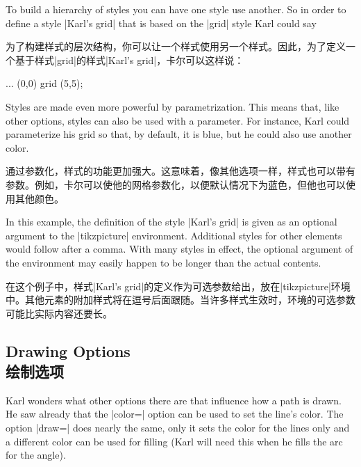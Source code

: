 To build a hierarchy of styles you can have one style use another. So in order
to define a style |Karl's grid| that is based on the |grid| style Karl could
say
%

为了构建样式的层次结构，你可以让一个样式使用另一个样式。因此，为了定义一个基于样式|grid|的样式|Karl's grid|，卡尔可以这样说：

\begin{codeexample}
...
 (0,0) grid (5,5);
\end{codeexample}

Styles are made even more powerful by parametrization. This means that, like
other options, styles can also be used with a parameter. For instance, Karl
could parameterize his grid so that, by default, it is blue, but he could also
use another color.
%

通过参数化，样式的功能更加强大。这意味着，像其他选项一样，样式也可以带有参数。例如，卡尔可以使他的网格参数化，以便默认情况下为蓝色，但他也可以使用其他颜色。

\begin{codeexample}
\end{codeexample}

 In this example, the definition of the style |Karl's grid| is given as an
 optional argument to the |{tikzpicture}| environment. Additional styles for other
 elements would follow after a comma. With many styles in effect, the optional
 argument of the environment may easily happen to be longer than the actual
 contents.

 在这个例子中，样式|Karl's grid|的定义作为可选参数给出，放在|{tikzpicture}|环境中。其他元素的附加样式将在逗号后面跟随。当许多样式生效时，环境的可选参数可能比实际内容还要长。

\subsection{Drawing Options\\绘制选项}

Karl wonders what other options there are that influence how a path is drawn.
He saw already that the |color=| option can be used to set the
line's color. The option |draw=| does nearly the same, only it sets
the color for the lines only and a different color can be used for filling
(Karl will need this when he fills the arc for the angle).

